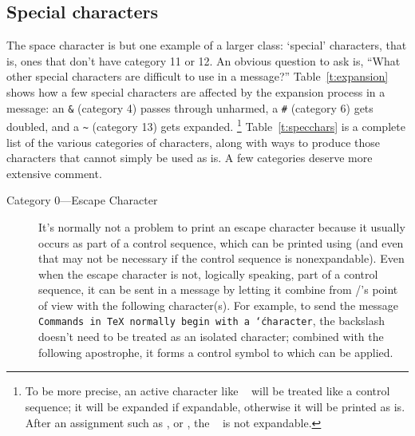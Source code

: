 {\subsection{Special characters}

The space character is but one example of a larger class:
`special' characters, that is, ones that don't have category 11 or 12.
An obvious
question to ask is, ``What other special characters are difficult to
use in a message?'' Table~\ref{t:expansion} shows how a few special
characters are affected by the expansion process in a message: an
\verb;&; (category 4) passes through unharmed, a \verb;#; (category
6) gets doubled, and a \verb;~; (category 13) gets expanded.%
\footnote{To be more precise, an active character like {\tt\string ~}
will be treated like a control sequence; it will be expanded if
expandable, otherwise it will be printed as is. After an
assignment such as
, or  ,
the {\tt\string ~} is not expandable.}
Table~\ref{t:specchars} is a complete list
of the various categories of characters,
along with  ways to produce those characters that cannot simply be
used as is. A few categories deserve more extensive comment.
  \begin{description}
  \item[Category 0---Escape Character] It's normally not a problem to
print an escape character because it usually occurs as part of a
control sequence, which can be printed using  (and even
that may not be necessary if the control sequence is nonexpandable).
Even when the escape character is not, logically speaking, part of a
control sequence, it can be sent in a message by letting it combine
from \tex/'s point of view with the following character(s). For
example, to send the message {\tt Commands in TeX normally begin with
a `\string\' character}, the backslash doesn't need to be treated as
an isolated character; combined with the following apostrophe, it
forms a control symbol to which  can be applied.


\end{description}}
